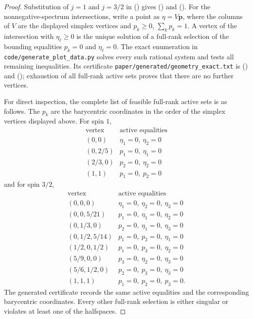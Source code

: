 \documentclass[twoside,10pt]{article}
\numberwithin{equation}{section}
\theoremstyle{slbody}
\theoremstyle{definition}
\theoremstyle{remark}
\renewcommand{\eqref}[1]{%
  \textup{{\normalfont(\oldstylenums{\ref{#1}}}\normalfont)}}
\begin{document}
\begin{proof}
Substitution of \(j=1\) and \(j=3/2\) in
\eqref{eq:vertex-eigenvalues} gives
\eqref{eq:spin-one-simplex} and \eqref{eq:spin-three-simplex}.
For the nonnegative-spectrum intersections, write a point as
\(\eta=V\bm p\), where the columns of \(V\) are the displayed
simplex vertices and \(p_k\geq0\), \(\sum_kp_k=1\).
A vertex of the intersection with \(\eta_\ell\geq0\) is the unique
solution of a full-rank selection of the bounding equalities
\(p_k=0\) and \(\eta_\ell=0\).  The exact enumeration in
\texttt{code/generate\_plot\_data.py} solves every such rational
system and tests all remaining inequalities.  Its certificate
\texttt{paper/generated/geometry\_exact.txt} is
\eqref{eq:spin-one-positive-polytope} and
\eqref{eq:spin-three-positive-polytope}; exhaustion of all full-rank
active sets proves that there are no further vertices.

For direct inspection, the complete list of feasible full-rank active
sets is as follows.  The \(p_k\) are the barycentric coordinates in the
order of the simplex vertices displayed above.
For spin \(1\),
\begin{equation*}
\begin{array}{c|l}
 \text{vertex}&\text{active equalities}\\
 \hline
 (0,0)&\eta_1=0,\ \eta_2=0\\
 (0,2/5)&p_1=0,\ \eta_1=0\\
 (2/3,0)&p_2=0,\ \eta_2=0\\
 (1,1)&p_1=0,\ p_2=0
\end{array}
\end{equation*}
and for spin \(3/2\),
\begin{equation*}
\begin{array}{c|l}
 \text{vertex}&\text{active equalities}\\
 \hline
 (0,0,0)&\eta_1=0,\ \eta_2=0,\ \eta_3=0\\
 (0,0,5/21)&p_1=0,\ \eta_1=0,\ \eta_2=0\\
 (0,1/3,0)&p_2=0,\ \eta_1=0,\ \eta_3=0\\
 (0,1/2,5/14)&p_1=0,\ p_2=0,\ \eta_1=0\\
 (1/2,0,1/2)&p_1=0,\ p_3=0,\ \eta_2=0\\
 (5/9,0,0)&p_3=0,\ \eta_2=0,\ \eta_3=0\\
 (5/6,1/2,0)&p_2=0,\ p_3=0,\ \eta_3=0\\
 (1,1,1)&p_1=0,\ p_2=0,\ p_3=0.
\end{array}
\end{equation*}
The generated certificate records the same active equalities and the
corresponding barycentric coordinates.  Every other full-rank selection
is either singular or violates at least one of the halfspaces.
\end{proof}
\end{document}
